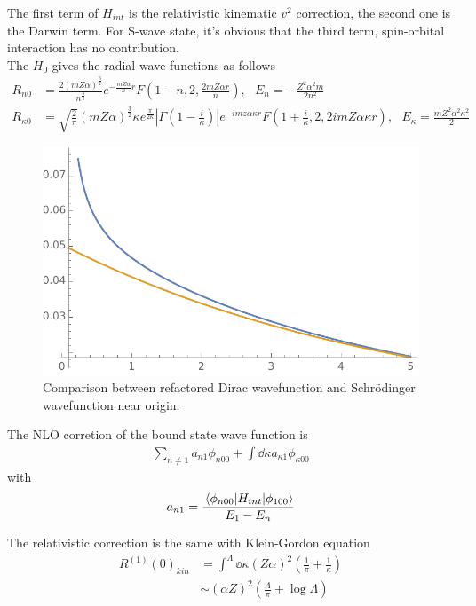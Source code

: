 \documentclass[aps,prd,preprint,showkeys,notitlepage,10pt]{revtex4-1}
\newcommand{\ka}{\kappa}
\begin{document}
The first term of $H_{int}$ is the relativistic kinematic $v^2$ correction, the second one is the Darwin term. For S-wave state, it's obvious that the third term, spin-orbital interaction has no contribution. \\
The $H_0$ gives the radial wave functions as follows
\begin{align}
	R_{n0}      & =\frac{2(mZ\alpha)^\frac{3}{2}}{n^\frac{3}{2}}e^{-\frac{mZ\alpha}{n}r}F(1-n,2,\frac{2mZ\alpha r}{n}),\ \ \ E_n=-\frac{Z^2\alpha^2m}{2n^2}                                                                           \\
	R_{\kappa0} & =\sqrt{\frac{2}{\pi}}(mZ\alpha)^\frac{3}{2}\kappa e^\frac{\pi}{2\kappa}|\Gamma(1-\frac{i}{\kappa})|e^{-imz\alpha \kappa r}F(1+\frac{i}{\kappa},2,2imZ\alpha \kappa r),\ \ \ E_\kappa=\frac{mZ^2\alpha^2\kappa^2}{2}
\end{align}
\begin{figure}[!tbhp]
	\centering
	\includegraphics[width=4 in]{QM-Dirac-1.pdf}
	\caption{Comparison between refactored Dirac wavefunction and Schr\"odinger wavefunction near origin. }
\end{figure}

The NLO corretion of the bound state wave function is
\begin{align}
	\sum_{n\neq 1}a_{n1}\phi_{n00}+\int \dd\ka a_{\ka1}\phi_{\ka00}
\end{align}
with
\begin{align}
	a_{n1}=\frac{\mel{\phi_{n00}}{H_{int}}{\phi_{100}}}{E_1-E_n}
\end{align}

The relativistic correction is the same with Klein-Gordon equation
\begin{align}
	R^{(1)}(0)_{kin} & =\int^\Lambda\dd\ka(Z\alpha)^2(\frac{1}{\pi}+\frac{1}{\ka}) \\
	                 & \sim(\alpha Z)^2(\frac{\Lambda}{\pi }+\log{\Lambda})
\end{align}
\end{document}
